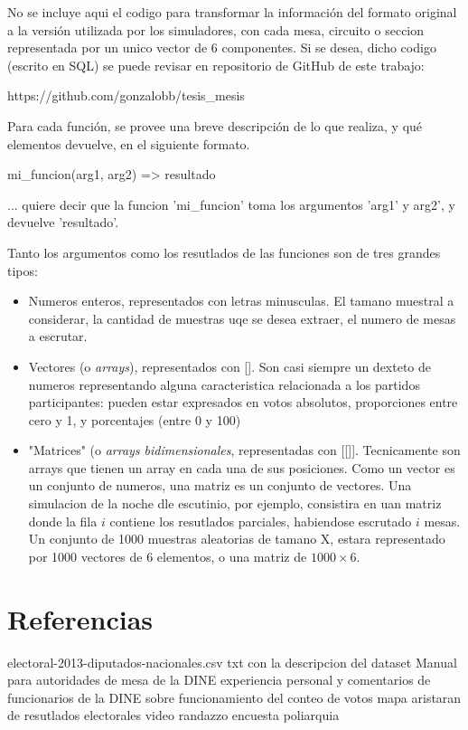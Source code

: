 \documentclass[12pt, a4paper]{article}
\begin{document}
No se incluye aqui el codigo para transformar la informaci\'on del formato original a la versi\'on utilizada por los simuladores, con cada mesa, circuito o seccion representada por un unico vector de 6 componentes. Si se desea, dicho codigo (escrito en SQL) se puede revisar en repositorio de GitHub de este trabajo:

https://github.com/gonzalobb/tesis\_mesis 

Para cada funci\'on, se provee una breve descripci\'on de lo que realiza, y qu\'e elementos devuelve, en el siguiente formato.

  mi\_funcion(arg1, arg2) => resultado

... quiere decir que la funcion 'mi\_funcion' toma los argumentos 'arg1' y arg2', y devuelve 'resultado'.

Tanto los argumentos como los resutlados de las funciones son de tres grandes tipos:


\begin{center}
  \begin{itemize}
  \item Numeros enteros, representados con letras minusculas. El tamano muestral a considerar, la cantidad de muestras uqe se desea extraer, el numero de mesas a escrutar.
\item Vectores (o \textit{arrays}), representados con []. Son casi siempre un dexteto de numeros representando alguna caracteristica relacionada a los partidos participantes: pueden estar expresados en votos absolutos, proporciones entre cero y 1, y porcentajes (entre 0 y 100)

\item "Matrices" (o \textit{arrays bidimensionales}, representadas con [[]]. Tecnicamente son arrays que tienen un array en cada una de sus posiciones. Como un vector es un conjunto de numeros, una matriz es un conjunto de vectores. Una simulacion de la noche dle escutinio, por ejemplo, consistira en uan matriz donde la fila $i$ contiene los resutlados parciales, habiendose escrutado $i$ mesas. Un conjunto de 1000 muestras aleatorias de tamano X, estara representado por 1000 vectores de 6 elementos, o una matriz de $ 1000 \times 6 $.
\end{itemize}
\end{center}


\restoregeometry

\section{Referencias}
electoral-2013-diputados-nacionales.csv
txt con la descripcion del dataset
Manual para autoridades de mesa de la DINE
experiencia personal y comentarios de funcionarios de la DINE sobre funcionamiento del conteo de votos
mapa aristaran de resutlados electorales
video randazzo
encuesta poliarquia
\end{document}
